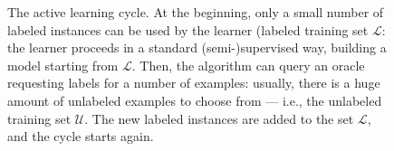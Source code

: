 \begin{figure}
    \caption{The active learning cycle. At the beginning, only a small number of labeled instances can be used by the learner (labeled training set \(\mathcal{L}\): the learner proceeds in a standard (semi-)supervised way, building a model starting from \(\mathcal{L}\). Then, the algorithm can query an oracle requesting labels for a number of examples: usually, there is a huge amount of unlabeled examples to choose from --- i.e., the unlabeled training set \(\mathcal{U}\). The new labeled instances are added to the set \(\mathcal{L}\), and the cycle starts again.}
    \label{active_learning_cycle}
\end{figure}